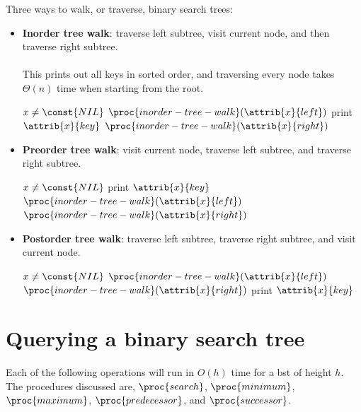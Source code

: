 \documentclass{article}
\begin{document}
Three ways to walk, or traverse, binary search trees:
\begin{itemize}
    \item[]\textbf{Inorder tree walk}: traverse left subtree, visit current node, and then traverse right subtree. 
    \\ \\
    This prints out all keys in sorted order, and traversing every node takes $\Theta{(n)}$ time when starting from the root.
    \begin{codebox}
    \li \If $x \neq \const{NIL}$
    \li \Then
            $\proc{inorder-tree-walk}(\attrib{x}{left})$
    \li     print $\attrib{x}{key}$
    \li     $\proc{inorder-tree-walk}(\attrib{x}{right})$
    \end{codebox}

    \item[]\textbf{Preorder tree walk}: visit current node, traverse left subtree, and traverse right subtree.
    
    \begin{codebox}
    \li \If $x \neq \const{NIL}$
    \li \Then
            print $\attrib{x}{key}$
    \li     $\proc{inorder-tree-walk}(\attrib{x}{left})$
    \li     $\proc{inorder-tree-walk}(\attrib{x}{right})$
    \end{codebox}
    
    \item[]\textbf{Postorder tree walk}: traverse left subtree, traverse
        right subtree, and visit current node.
    
    \begin{codebox}
    \li \If $x \neq \const{NIL}$
    \li \Then
            $\proc{inorder-tree-walk}(\attrib{x}{left})$
    \li     $\proc{inorder-tree-walk}(\attrib{x}{right})$
    \li     print $\attrib{x}{key}$
    \end{codebox}
    
\end{itemize}

\section*{Querying a binary search tree}
Each of the following operations will run in $O(h)$ time for a bst of height $h$. The procedures discussed are, $\proc{search}$, $\proc{minimum}$, $\proc{maximum}$, $\proc{predecessor}$, and $\proc{successor}$.
\end{document}

